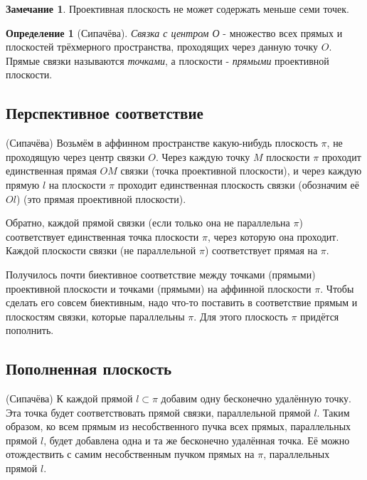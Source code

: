 \documentclass[a4paper, 12pt]{article}
\theoremstyle{definition}
\newtheorem*{definition}{Определение}
\newtheorem*{remark}{Замечание}
\begin{document}
\begin{remark}
    Проективная плоскость не может содержать меньше семи точек.
\end{remark}

\begin{definition}[Сипачёва]
    \textit{Связка с центром О} - множество всех прямых и плоскостей трёхмерного пространства, проходящих через данную точку $O$. Прямые связки называются \textit{точками}, а плоскости - \textit{прямыми} проективной плоскости.
\end{definition}


\subsection{Перспективное соответствие}
(Сипачёва) Возьмём в аффинном пространстве какую-нибудь плоскость $\pi$, не проходящую через центр связки $O$. Через каждую точку $M$ плоскости $\pi$ проходит единственная прямая $OM$ связки (точка проективной плоскости), и через каждую прямую $l$ на плоскости $\pi$ проходит единственная плоскость связки (обозначим её $Ol$) (это прямая проективной плоскости).

Обратно, каждой прямой связки (если только она не параллельна $\pi$) соответствует единственная точка плоскости $\pi$, через которую она проходит. Каждой плоскости связки (не параллельной $\pi$) соответствует прямая на $\pi$.

Получилось почти биективное соответствие между точками (прямыми) проективной плоскости и точками (прямыми) на аффинной плоскости $\pi$. Чтобы сделать его совсем биективным, надо что-то поставить в соответствие прямым и плоскостям связки, которые параллельны $\pi$. Для этого плоскость $\pi$ придётся пополнить.


\subsection{Пополненная плоскость}
(Сипачёва) К каждой прямой $l \subset \pi$ добавим одну бесконечно удалённую точку. Эта точка будет соответствовать прямой связки, параллельной прямой $l$. Таким образом, ко всем прямым из несобственного пучка всех прямых, параллельных прямой $l$, будет добавлена одна и та же бесконечно удалённая точка. Её можно отождествить с самим несобственным пучком прямых на $\pi$, параллельных прямой $l$.
\end{document}
